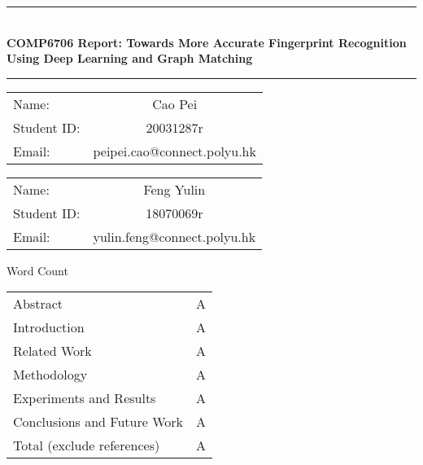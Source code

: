 \documentclass[12pt, a4paper]{article}
\newcommand{\horrule}[1]{\rule{\linewidth}{#1}}
\newcommand{\entit}{COMP6706 Report: Towards More Accurate Fingerprint Recognition Using Deep Learning and Graph Matching}
\begin{document}
\begin{titlepage}
    \begin{center}
        \horrule{0.5pt} \\ [0.4cm]
        \vspace{-1.5ex}
        { \bfseries \entit \\ \vspace{0.4cm}}
          \horrule{2pt} \vspace{-2ex}
    \end{center}

    \vspace{2cm}
    \begin{table}[h]
        \centering
        \begin{tabular}{lc}
          Name:  & {Cao Pei}            \\
          Student ID:  & {20031287r}          \\
          Email:  & {peipei.cao@connect.polyu.hk} \\
        \end{tabular}
    \end{table}

    \vspace{1cm}
    \begin{table}[h]
        \centering
        \begin{tabular}{lc}
          Name:  & {Feng Yulin}            \\
          Student ID:  & {18070069r}          \\
          Email:  & {yulin.feng@connect.polyu.hk} \\
        \end{tabular}
    \end{table}

    \vspace{1cm}
    \centering Word Count
    \begin{table}[htbp]
      \centering
      \begin{tabular}{l|c}
        \hline
        Abstract & A \\
        Introduction & A \\
        Related Work & A \\
        Methodology & A \\
        Experiments and Results & A \\
        Conclusions and Future Work & A \\ \hline
        Total (exclude references) & A \\ \hline
      \end{tabular}
    \end{table}

\end{titlepage}
\end{document}
